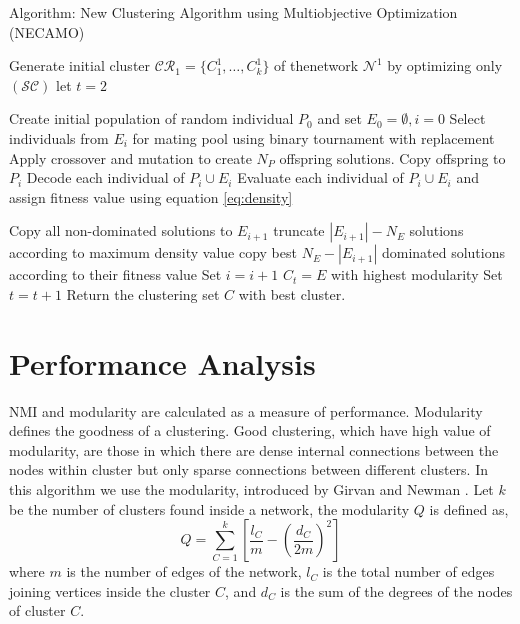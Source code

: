 \documentclass[12pt]{arsubmit}
\begin{document}
\begin{algorithm}
\caption{Algorithm: New Clustering Algorithm using Multiobjective Optimization (NECAMO)}
\label{necamo}
\begin{algorithmic}[1]

\State Generate initial cluster $\mathcal{CR}_1 = \{C_1^1,\ldots,C_k^1\}$ of thenetwork $\mathcal{N}^1$ by optimizing only $(\mathcal{SC})$
\State let $t = 2$


\State Create initial population of random individual $P_0$ and set $E_0 = \emptyset, i = 0$
\State Select individuals from $E_i$ for mating pool using binary tournament with replacement
\State Apply crossover and mutation to create $N_P$ offspring solutions. Copy offspring to $P_i$
\State Decode each individual of $P_i \cup E_i$ \label{decode}
\State Evaluate each individual of $P_i \cup E_i$  and assign fitness value  using equation \ref {eq:density}

\State Copy all non-dominated solutions to $E_{i+1}$
\State truncate $|E_{i+1}| - N_E$ solutions according to maximum density value
\Else
\State copy best $N_E - |E_{i+1}|$ dominated solutions according to their fitness value
\EndIf
\State  Set $i = i +1$
\EndWhile
\State $C_t = E$ with highest modularity 
\State Set $t = t +1$
\EndWhile
\State Return the clustering set $C$ with best cluster. \label{last}
\EndProcedure
\end{algorithmic}
\end{algorithm}


\section {Performance Analysis}
NMI and modularity are calculated as a measure of performance. Modularity defines the goodness of a clustering. Good clustering, which have high value of modularity, are those in which there are dense internal connections between the nodes within cluster but only sparse connections between different clusters. In this algorithm we use the modularity, introduced by Girvan and Newman \cite{dynmoga16}. Let $k$ be the number of clusters found inside a network, the modularity $Q$ is defined as,
\begin{equation}
Q = \sum\limits_{C=1}^k \left[ \frac {l_C} {m} - {\left(\frac {d_C}{2m}\right)}^2\right]
\end{equation}
where $m$ is the number of edges of the network, $l_C$ is the total number of edges joining vertices inside the cluster $C$, and $d_C$ is the sum of the degrees of the nodes of cluster $C$.
\end{document}
